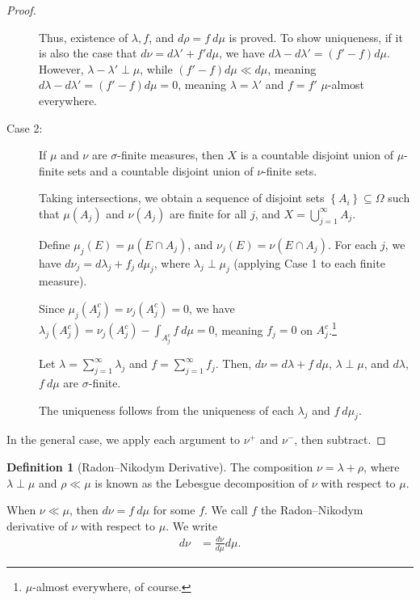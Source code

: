 \documentclass[12pt]{extarticle}
\newcommand{\set}[1]{\left\{#1\right\}}
\theoremstyle{plain}
\theoremstyle{definition}
\newtheorem*{definition}{Definition}
\theoremstyle{note}
\renewcommand{\newline}{\hfill\break}
\begin{document}
\begin{proof}
\begin{description}
      Thus, existence of $\lambda,f$, and $d\rho = f\:d\mu$ is proved. To show uniqueness, if it is also the case that $d\nu = d\lambda' + f'd\mu$, we have $d\lambda - d\lambda' = \left(f' - f\right)d\mu$. However, $\lambda - \lambda' \perp \mu$, while $\left(f' - f\right)d\mu \ll d\mu$, meaning $d\lambda - d\lambda' = \left(f'-f\right)d\mu = 0$, meaning $\lambda = \lambda '$ and $f = f'$ $\mu$-almost everywhere.
    \item[Case 2:] If $\mu$ and $\nu$ are $\sigma$-finite measures, then $X$ is a countable disjoint union of $\mu$-finite sets and a countable disjoint union of $\nu$-finite sets.\newline

      Taking intersections, we obtain a sequence of disjoint sets $\set{A_i}\subseteq \Omega$ such that $\mu\left(A_j\right)$ and $\nu\left(A_j\right)$ are finite for all $j$, and $X = \bigcup_{j=1}^{\infty}A_j$.\newline

      Define $\mu_j \left(E\right) = \mu\left(E\cap A_j\right)$, and $\nu_j\left(E\right) = \nu\left(E\cap A_j\right)$. For each $j$, we have $d\nu_j = d\lambda_j + f_j\:d\mu_j$, where $\lambda_j \perp \mu_j$ (applying Case 1 to each finite measure).\newline

      Since $\mu_j\left(A^{c}_j\right) = \nu_j\left(A^{c}_j\right) = 0$, we have $\lambda_j\left(A_j^{c}\right) = \nu_j\left(A_j^{c}\right) - \int_{A_{j}^c}^{} f\:d\mu = 0$, meaning $f_j = 0 $ on $A_{j}^c$.\footnote{$\mu$-almost everywhere, of course.}\newline

      Let $\lambda = \sum_{j=1}^{\infty}\lambda_j$ and $f = \sum_{j=1}^{\infty}f_j$. Then, $d\nu = d\lambda + f\:d\mu$, $\lambda \perp \mu$, and $d\lambda$, $f\:d\mu$ are $\sigma$-finite.\newline

      The uniqueness follows from the uniqueness of each $\lambda_j$ and $f\:d\mu_j$.
  \end{description}
  In the general case, we apply each argument to $\nu^{+}$ and $\nu^{-}$, then subtract.
\end{proof}
\begin{definition}[Radon--Nikodym Derivative]
  The composition $\nu = \lambda + \rho$, where $\lambda \perp \mu$ and $\rho \ll \mu$ is known as the Lebesgue decomposition of $\nu$ with respect to $\mu$.\newline

  When $\nu \ll \mu$, then $d\nu = f\:d\mu$ for some $f$. We call $f$ the Radon--Nikodym derivative of $\nu$ with respect to $\mu$. We write
  \begin{align*}
    d\nu &= \frac{d\nu}{d\mu} d\mu.
  \end{align*}
\end{definition}
\end{document}
